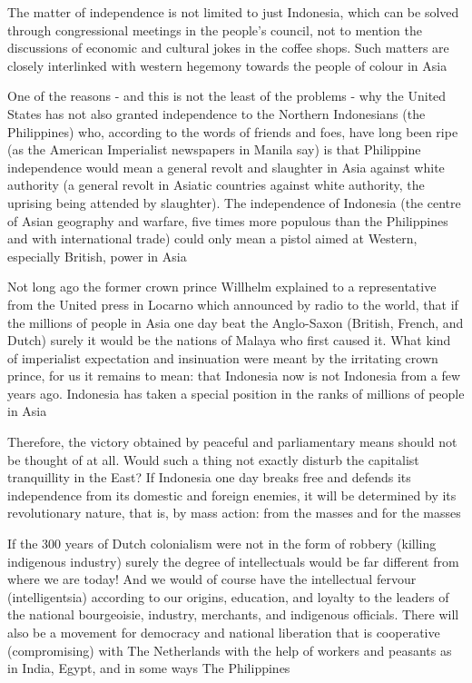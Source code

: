 The matter of independence is not limited to just Indonesia, which can be solved through congressional meetings 
in the people's council, not to mention the discussions of economic and cultural jokes in the coffee shops. 
Such matters are closely interlinked with western hegemony towards the people of colour in Asia\nline

One of the reasons - and this is not the least of the problems - why the United States has not also granted independence 
to the Northern Indonesians (the Philippines) who, according to the words of friends and foes, have long been ripe 
(as the American Imperialist newspapers in Manila say) is that Philippine independence would mean a general revolt and slaughter in 
Asia against white authority (a general revolt in Asiatic countries against white authority, the uprising being attended by slaughter). 
The independence of Indonesia (the centre of Asian geography and warfare, five times more populous than the Philippines 
and with international trade) could only mean a pistol aimed at Western, especially British, power in Asia\nline

Not long ago the former crown prince Willhelm explained to a representative from the United press 
in Locarno which announced by radio to the world, that if the millions of people in Asia one day beat 
the Anglo-Saxon (British, French, and Dutch) surely it would be the nations of Malaya who first caused it. 
What kind of imperialist expectation and insinuation were meant by the irritating crown prince, for us 
it remains to mean: that Indonesia now is not Indonesia from a few years ago. Indonesia has taken a special 
position in the ranks of millions of people in Asia\nline

Therefore, the victory obtained by peaceful and parliamentary means should not be thought of at all. 
Would such a thing not exactly disturb the capitalist tranquillity in the East? If Indonesia one day 
breaks free and defends its independence from its domestic and foreign enemies, it will be determined by its 
revolutionary nature, that is, by mass action: from the masses and for the masses\nline

If the 300 years of Dutch colonialism were not in the form of robbery (killing indigenous industry) surely 
the degree of intellectuals would be far different from where we are today! And we would of course have 
the intellectual fervour (intelligentsia) according to our origins, education, and loyalty to the leaders 
of the national bourgeoisie, industry, merchants, and indigenous officials. There will also be a movement 
for democracy and national liberation that is cooperative (compromising) with The Netherlands 
with the help of workers and peasants as in India, Egypt, and in some ways The Philippines\nline

